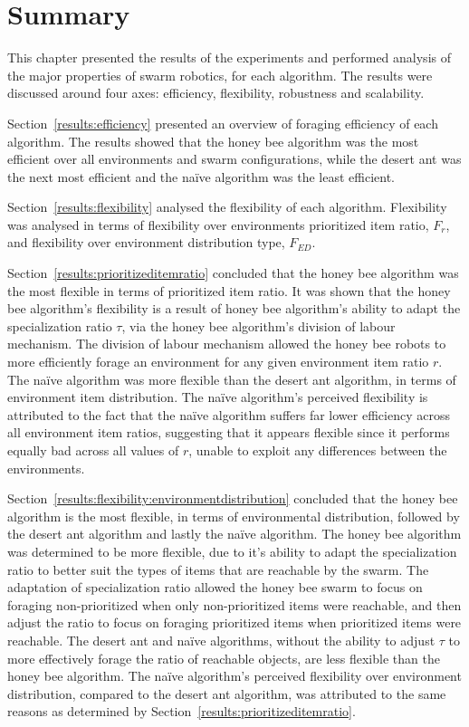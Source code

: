 \section{Summary}
\label{results:summary}

This chapter presented the results of the experiments and performed analysis of the major properties of swarm robotics, for each algorithm. The results were discussed around four axes: efficiency, flexibility, robustness and scalability. 

Section~\ref{results:efficiency} presented an overview of foraging efficiency of each algorithm. The results showed that the honey bee algorithm was the most efficient over all environments and swarm configurations, while the desert ant was the next most efficient and the na\"ive algorithm was the least efficient.

Section~\ref{results:flexibility} analysed the flexibility of each algorithm. Flexibility was analysed in terms of flexibility over environments prioritized item ratio, $F_r$, and flexibility over environment distribution type, $F_{ED}$. 

Section~\ref{results:prioritizeditemratio} concluded that the honey bee algorithm was the most flexible in terms of prioritized item ratio. It was shown that the honey bee algorithm's flexibility is a result of honey bee algorithm's ability to adapt the specialization ratio $\tau$, via the honey bee algorithm's division of labour mechanism. The division of labour mechanism allowed the honey bee robots to more efficiently forage an environment for any given environment item ratio $r$. The na\"ive algorithm was more flexible than the desert ant algorithm, in terms of environment item distribution. The na\"ive algorithm's perceived flexibility is attributed to the fact that the na\"ive algorithm suffers far lower efficiency across all environment item ratios, suggesting that it appears flexible since it performs equally bad across all values of $r$, unable to exploit any differences between the environments. 

Section~\ref{results:flexibility:environmentdistribution} concluded that the honey bee algorithm is the most flexible, in terms of environmental distribution, followed by the desert ant algorithm and lastly the na\"ive algorithm. The honey bee algorithm was determined to be more flexible, due to it's ability to adapt the specialization ratio to better suit the types of items that are reachable by the swarm. The adaptation of specialization ratio allowed the honey bee swarm to focus on foraging non-prioritized when only non-prioritized items were reachable, and then adjust the ratio to focus on foraging prioritized items when prioritized items were reachable. The desert ant and na\"ive algorithms, without the ability to adjust $\tau$ to more effectively forage the ratio of reachable objects, are less flexible than the honey bee algorithm.
  The na\"ive algorithm's perceived flexibility over environment distribution, compared to the desert ant algorithm, was attributed to the same reasons as determined by Section~\ref{results:prioritizeditemratio}. 
  
